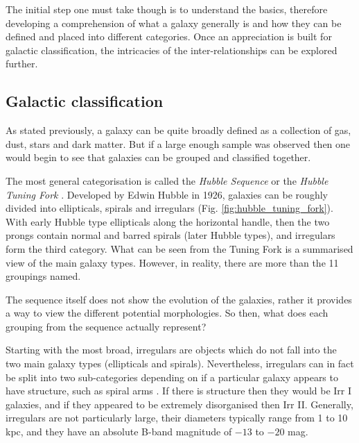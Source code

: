 \documentclass[12pt, twocolumn]{revtex4-1}    %
\begin{document}
The initial step one must take though is to understand the basics, therefore developing a comprehension of what a galaxy generally is and how they can be defined and placed into different categories. Once an appreciation is built for galactic classification, the intricacies of the inter-relationships can be explored further. 


\subsection{Galactic classification}

As stated previously, a galaxy can be quite broadly defined as a collection of gas, dust, stars and dark matter. But if a large enough sample was observed then one would begin to see that galaxies can be grouped and classified together.

The most general categorisation is called the \textit{Hubble Sequence} or the \textit{Hubble Tuning Fork} \citep{carroll_astro}. Developed by Edwin Hubble in 1926, galaxies can be roughly divided into ellipticals, spirals and irregulars (Fig. \ref{fig:hubble_tuning_fork}). With early Hubble type ellipticals along the horizontal handle, then the two prongs contain normal and barred spirals (later Hubble types), and irregulars form the third category. What can be seen from the Tuning Fork is a summarised view of the main galaxy types. However, in reality, there are more than the 11 groupings named.

The sequence itself does not show the evolution of the galaxies, rather it provides a way to view the different potential morphologies. So then, what does each grouping from the sequence actually represent? 

Starting with the most broad, irregulars are objects which do not fall into the two main galaxy types (ellipticals and spirals). Nevertheless, irregulars can in fact be split into two sub-categories depending on if a particular galaxy appears to have structure, such as spiral arms \citep{carroll_astro}. If there is structure then they would be Irr I galaxies, and if they appeared to be extremely disorganised then Irr II. Generally, irregulars are not particularly large, their diameters typically range from 1 to 10 kpc, and they have an absolute B-band magnitude of $-13$ to $-20$ mag.

\end{document}
